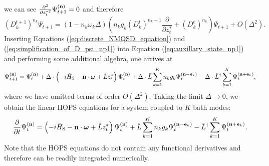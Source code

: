 we can see $\frac{\partial^2}{\partial z_t^{*2}}\Psi^{(\vectorbold{n})}_{t+1} = 0$ and therefore
\begin{equation}
    \label{eq:simplification_of_D_psi_np1}
    \left(D_k^{t+1}\right)^{n_k} \Psi_{t+1} = \left(1-n_k\omega_k\Delta\right)
    \left(n_k g_k \left(D_k^t\right)^{n_k-1}\frac{\partial}{\partial z_t^*} + \left(D_k^t\right)^{n_k}\right) \Psi_{t+1} + O\left(\Delta^2\right).
\end{equation}
Inserting Equations (\ref{eq:discrete_NMQSD_equation}) and (\ref{eq:simplification_of_D_psi_np1}) into Equation (\ref{eq:auxillary_state_np1}) and performing some
additional algebra, one arrives at
\begin{equation*}
    \Psi_{t+1}^{(\vectorbold{n})} = \Psi_t^{(\vectorbold{n})} + \Delta\cdot\left(
        -i\hat{H}_\text{S} - \vectorbold{n}\cdot\boldsymbol{\omega} + \hat{L}z_t^*
    \right) \Psi_t^{(\vectorbold{n})}
    + \Delta \cdot \hat{L}\sum_{k=1}^{K}n_kg_k\Psi_t^{(\vectorbold{n}-\vectorbold{e}_k)}
    - \Delta \cdot \hat{L}^\dagger\sum_{k=1}^{K}\Psi_t^{(\vectorbold{n}+\vectorbold{e}_k)},
\end{equation*}
where we have omitted terms of order $O\left(\Delta^2\right)$.
Taking the limit $\Delta \rightarrow 0$, we obtain the linear HOPS equations for a system coupled to $K$ bath modes:
\begin{equation}
    \label{eq:linear_HOPS_single_site}
    \frac{\partial}{\partial t}\Psi_t^{(\vectorbold{n})} = \left(
        -i\hat{H}_\text{S} - \vectorbold{n}\cdot\boldsymbol{\omega} + \hat{L}z_t^*
    \right) \Psi_t^{(\vectorbold{n})}
    + \hat{L}\sum_{k=1}^{K}n_kg_k\Psi_t^{(\vectorbold{n}-\vectorbold{e}_k)}
    - \hat{L}^\dagger\sum_{k=1}^{K}\Psi_t^{(\vectorbold{n}+\vectorbold{e}_k)}.
\end{equation}
Note that the HOPS equations do not contain any functional derivatives and therefore can be readily integrated numerically.